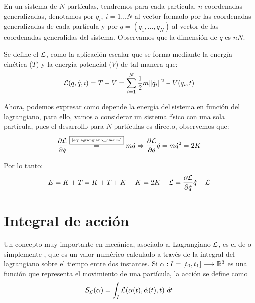 En un sistema de $N$ partículas, tendremos para cada partícula, $n$ coordenadas generalizadas, denotamos por $q_i,\ i=1\dots N$ al vector formado por las coordenadas generalizadas de cada partícula y por $q=(q_1,\dots,q_N)$ al vector de las coordenadas generalidas del sistema.
Observamos que la dimensión de $q$ es $nN$.

Se define el  $\mathcal{L}$, como la aplicación escalar que se forma mediante la energía cinética ($T$) y la energía potencial ($V$) de tal manera que:
\begin{equation}
	\label{eq:lagrangiano_clasico}
	\mathcal{L}(q,\dot{q},t)=T-V=\sum\limits_{i=1}^{N} \frac{1}{2}m\|\dot{q_i}\|^2-V(q_i,t)
\end{equation}

Ahora, podemos expresar como depende la energía del sistema en función del lagrangiano, para ello, vamos a considerar un sistema físico con una sola partícula, pues el desarrollo para $N$ partículas es directo, observemos que:
\begin{equation*}
	\frac{\partial\mathcal{L}}{\partial\dot{q}}\overset{\fbox{\tiny \ref{eq:lagrangiano_clasico}}}{=}m\dot{q}\Rightarrow \frac{\partial\mathcal{L}}{\partial\dot{q}}\dot{q} =m\dot{q}^2 = 2K
\end{equation*}

Por lo tanto:
\begin{equation}
	\label{eq:energia-lagrangiana}
	E=K+T=K+T+K-K=2K-\mathcal{L}=\frac{\partial\mathcal{L}}{\partial\dot{q}}\dot{q}-\mathcal{L}
\end{equation}
\section{Integral de acción}\label{sec:integral-de-accion}

Un concepto muy importante en mecánica, asociado al Lagrangiano $\mathcal{L}$, es el de  o simplemente , que es un valor numérico calculado a través de la integral del lagrangiano sobre el tiempo entre dos instantes.
Si $\alpha:I=[t_0, t_1]\longrightarrow \mathbb{R}^3$ es una función que representa el movimiento de una partícula, la acción se define como
\begin{equation}
	\label{eq:accion}
	S_{\mathcal{L}}(\alpha) = \int_{I}\mathcal{L}(\alpha(t), \dot{\alpha}(t), t)\ dt
\end{equation}

